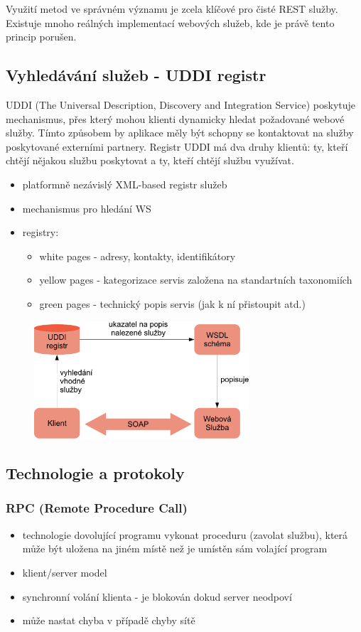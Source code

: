 Využití metod ve správném významu je zcela klíčové pro čisté REST služby. Existuje mnoho reálných implementací webových služeb, kde je právě tento princip porušen.


\subsection{Vyhledávání služeb - UDDI registr}
UDDI (The Universal Description, Discovery and Integration Service) poskytuje mechanismus, přes který mohou klienti dynamicky hledat požadované webové služby. Tímto způsobem by aplikace měly být schopny se kontaktovat na služby poskytované externími partnery. Registr UDDI má dva druhy klientů: ty, kteří chtějí nějakou službu poskytovat a ty, kteří chtějí službu využívat.

\begin{itemize}[itemsep=0px]
\item platformně nezávislý XML-based registr služeb
\item mechanismus pro hledání WS
\item registry:
\begin{itemize}[itemsep=0px]
\item white pages - adresy, kontakty, identifikátory
\item yellow pages - kategorizace servis založena na standartních taxonomiích
\item green pages - technický popis servis (jak k ní přistoupit atd.)
\end{itemize}
\end{itemize}

\begin{figure}[h!]
\centering
\includegraphics[width=80mm]{10/images/uddi}
\end{figure}

\subsection{Technologie a protokoly}
\subsubsection*{RPC (Remote Procedure Call)}
\begin{itemize}[itemsep=0px]
\item technologie dovolující programu vykonat proceduru (zavolat službu), která může být uložena na jiném místě než je umístěn sám volající program
\item klient/server model
\item synchronní volání klienta - je blokován dokud server neodpoví
\item může nastat chyba v případě chyby sítě
\end{itemize}

